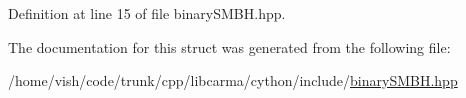 Definition at line 15 of file binary\-S\-M\-B\-H.\-hpp.



The documentation for this struct was generated from the following file\-:\begin{DoxyCompactItemize}
\item 
/home/vish/code/trunk/cpp/libcarma/cython/include/\hyperlink{binary_s_m_b_h_8hpp}{binary\-S\-M\-B\-H.\-hpp}\end{DoxyCompactItemize}
